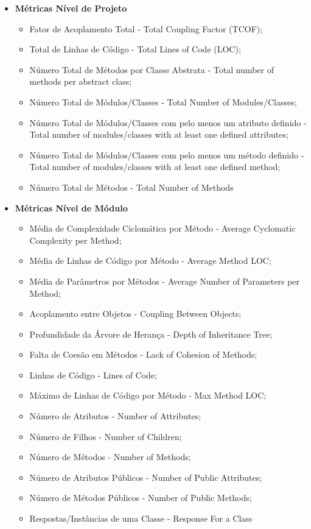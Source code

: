 \begin{itemize}
  \item \textbf{Métricas Nível de Projeto}
		\begin{itemize}
			\item Fator de Acoplamento Total - Total Coupling Factor (TCOF);
			\item Total de Linhas de Código - Total Lines of Code (LOC);
			\item Número Total de Métodos por Classe Abstrata - Total number of methods per abstract class;
			\item Número Total de Módulos/Classes - Total Number of Modules/Classes;
			\item Número Total de Módulos/Classes com pelo menos um atributo definido - Total number of modules/classes with at least one defined attributes;
			\item Número Total de Módulos/Classes com pelo menos um método definido - Total number of modules/classes with at least one defined method;
			\item Número Total de Métodos - Total Number of Methods
		\end{itemize}
  \item \textbf{Métricas Nível de Módulo}
		\begin{itemize}
			\item Média de Complexidade Ciclomática por Método - Average Cyclomatic Complexity per Method;
			\item Média de Linhas de Código por Método - Average Method LOC;
			\item Média de Parâmetros por Métodos - Average Number of Parameters per Method;
			\item Acoplamento entre Objetos - Coupling Between Objects;
			\item Profundidade da Árvore de Herança - Depth of Inheritance Tree;
			\item Falta de Coesão em Métodos - Lack of Cohesion of Methods;
			\item Linhas de Código - Lines of Code;
			\item Máximo de Linhas de Código por Método - Max Method LOC;
			\item Número de Atributos - Number of Attributes;
			\item Número de Filhos - Number of Children;
			\item Número de Métodos - Number of Methods;
			\item Número de Atributos Públicos - Number of Public Attributes;
			\item Número de Métodos Públicos - Number of Public Methods;
			\item Respostas/Instâncias de uma Classe - Response For a Class
		\end{itemize}
\end{itemize}

